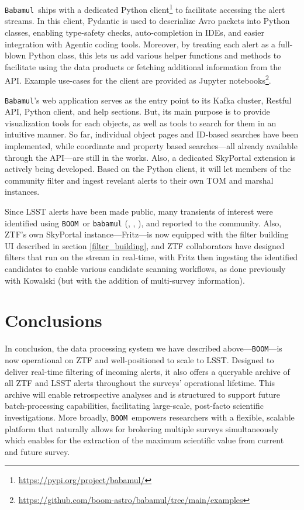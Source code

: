 \documentclass[twocolumn]{aastex631}
\newcommand{\boom}{\texttt{BOOM }}
\newcommand{\babamul}{\texttt{Babamul }}
\begin{document}
\babamul ships with a dedicated Python client\footnote{\url{https://pypi.org/project/babamul/}} to facilitate accessing the alert streams. In this client, Pydantic is used to deserialize Avro packets into Python classes, enabling type-safety checks, auto-completion in IDEs, and easier integration with Agentic coding tools. Moreover, by treating each alert as a full-blown Python class, this lets us add various helper functions and methods to facilitate using the data products or fetching additional information from the API. Example use-cases for the client are provided as Jupyter notebooks\footnote{\url{https://github.com/boom-astro/babamul/tree/main/examples}}.

\texttt{Babamul}'s web application serves as the entry point to its Kafka cluster, Restful API, Python client, and help sections. But, its main purpose is to provide visualization tools for each objects, as well as tools to search for them in an intuitive manner. So far, individual object pages and ID-based searches have been implemented, while coordinate and property based searches---all already available through the API---are still in the works. Also, a dedicated SkyPortal extension is actively being developed. Based on the Python client, it will let members of the community filter and ingest revelant alerts to their own TOM and marshal instances.

Since LSST alerts have been made public, many transients of interest were identified using \boom or \texttt{babamul} (\cite{2026TNSAN..43....1H}, \cite{2026TNSAN..44....1K}, \cite{2026TNSAN..68....1J}), and reported to the community. Also, ZTF's own SkyPortal instance---Fritz---is now equipped with the filter building UI described in section \ref{filter_building}, and ZTF collaborators have designed filters that run on the stream in real-time, with Fritz then ingesting the identified candidates to enable various candidate scanning workflows, as done previously with Kowalski (but with the addition of multi-survey information).

\section{Conclusions}
\label{sec:conclusion}

In conclusion, the data processing system we have described
above---\texttt{BOOM}---is now operational on ZTF and well-positioned to scale to LSST.
Designed to deliver real-time filtering of incoming alerts, it also offers a queryable archive of all ZTF and LSST alerts throughout the surveys' operational lifetime. This archive will enable retrospective analyses and is structured to support future batch-processing capabilities, facilitating large-scale, post-facto scientific investigations. More broadly, \boom empowers researchers with a flexible, scalable platform that naturally allows for brokering multiple surveys simultaneously which enables for the extraction of the maximum scientific value from current and future survey.
\end{document}
